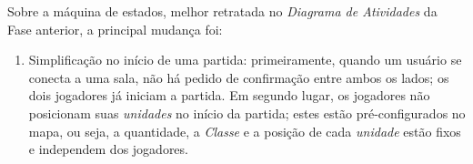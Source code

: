     Sobre a máquina de estados, melhor retratada no \emph{Diagrama de Atividades} da Fase anterior, a principal mudança foi:
    \begin{enumerate}
        \item Simplificação no início de uma partida: primeiramente, quando um usuário se conecta a uma sala, não há pedido de confirmação entre ambos os lados; os dois jogadores já iniciam a partida. Em segundo lugar, os jogadores não posicionam suas \emph{unidades} no início da partida; estes estão pré-configurados no mapa, ou seja, a quantidade, a \emph{Classe} e a posição de cada \emph{unidade} estão fixos e independem dos jogadores.
    \end{enumerate}
